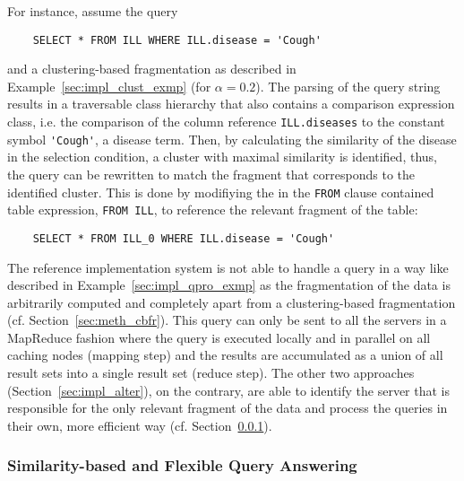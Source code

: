 \begin{exmp}
\label{sec:impl_qpro_exmp}
For instance, assume the query
\begin{verbatim}
    SELECT * FROM ILL WHERE ILL.disease = 'Cough'
\end{verbatim}
and a clustering-based fragmentation as described in Example~\ref{sec:impl_clust_exmp} (for $\alpha=0.2$). The parsing of the query string results in a 
traversable class hierarchy that also contains a comparison expression class, i.e. the comparison of the column reference \verb!ILL.diseases! to the constant 
symbol \verb!'Cough'!, a disease term. Then, by calculating the similarity of the disease in the selection condition, a cluster with maximal similarity is
identified, thus, the query can be rewritten to match the fragment that corresponds to the identified cluster. This is done by modifiying the in the 
\verb!FROM! clause contained table expression, \verb!FROM ILL!, to reference the relevant fragment of the table:
\begin{verbatim}
    SELECT * FROM ILL_0 WHERE ILL.disease = 'Cough'
\end{verbatim}
\end{exmp}

The reference implementation system is not able to handle a query in a way like described in Example~\ref{sec:impl_qpro_exmp} as the fragmentation of the data
is arbitrarily computed and completely apart from a clustering-based fragmentation (cf. Section~\ref{sec:meth_cbfr}). This query can only be sent
to all the servers in a MapReduce \citep{MapReduce2004} fashion where the query is executed locally and in parallel on all caching nodes (mapping step) and the 
results are accumulated as a union of all result sets into a single result set (reduce step). The other two approaches (Section~\ref{sec:impl_alter}), on the
contrary, are able to identify the server that is responsible for the only relevant fragment of the data and process the queries in their own, more efficient
way (cf. Section~\ref{sec:impl_qpro_sbfq}).


\subsubsection{Similarity-based and Flexible Query Answering}
\label{sec:impl_qpro_sbfq}

